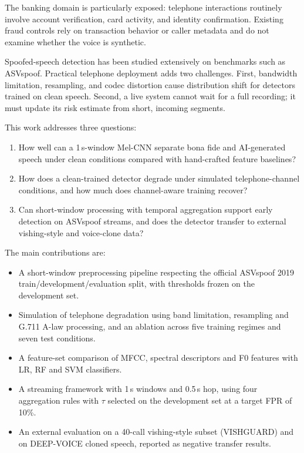 \documentclass[conference]{IEEEtran}
\begin{document}
The banking domain is particularly exposed: telephone interactions routinely involve account verification, card activity, and identity confirmation. Existing fraud controls rely on transaction behavior or caller metadata and do not examine whether the voice is synthetic.

Spoofed-speech detection has been studied extensively on benchmarks such as ASVspoof. Practical telephone deployment adds two challenges. First, bandwidth limitation, resampling, and codec distortion cause distribution shift for detectors trained on clean speech. Second, a live system cannot wait for a full recording; it must update its risk estimate from short, incoming segments.

This work addresses three questions:
\begin{enumerate}
  \item How well can a 1\,s-window Mel-CNN separate bona fide and AI-generated speech under clean conditions compared with hand-crafted feature baselines?
  \item How does a clean-trained detector degrade under simulated telephone-channel conditions, and how much does channel-aware training recover?
  \item Can short-window processing with temporal aggregation support early detection on ASVspoof streams, and does the detector transfer to external vishing-style and voice-clone data?
\end{enumerate}

The main contributions are:
\begin{itemize}
  \item A short-window preprocessing pipeline respecting the official ASVspoof 2019 train/development/evaluation split, with thresholds frozen on the development set.
  \item Simulation of telephone degradation using band limitation, resampling and G.711 A-law processing, and an ablation across five training regimes and seven test conditions.
  \item A feature-set comparison of MFCC, spectral descriptors and F0 features with LR, RF and SVM classifiers.
  \item A streaming framework with 1\,s windows and 0.5\,s hop, using four aggregation rules with $\tau$ selected on the development set at a target FPR of 10\%.
  \item An external evaluation on a 40-call vishing-style subset (VISHGUARD) and on DEEP-VOICE cloned speech, reported as negative transfer results.
\end{itemize}
\end{document}
